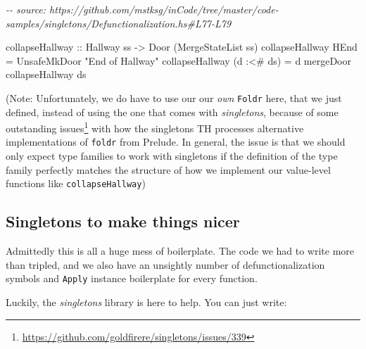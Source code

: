 \documentclass[]{article}
\newenvironment{Shaded}{}{}
\newcommand{\CommentTok}[1]{\textcolor[rgb]{0.38,0.63,0.69}{\textit{#1}}}
\newcommand{\DataTypeTok}[1]{\textcolor[rgb]{0.56,0.13,0.00}{#1}}
\newcommand{\NormalTok}[1]{#1}
\newcommand{\OperatorTok}[1]{\textcolor[rgb]{0.40,0.40,0.40}{#1}}
\newcommand{\OtherTok}[1]{\textcolor[rgb]{0.00,0.44,0.13}{#1}}
\newcommand{\StringTok}[1]{\textcolor[rgb]{0.25,0.44,0.63}{#1}}
\renewcommand{\href}[2]{#2\footnote{\url{#1}}}
\begin{document}
\begin{Shaded}
\begin{Highlighting}[]
\CommentTok{{-}{-} source: https://github.com/mstksg/inCode/tree/master/code{-}samples/singletons/Defunctionalization.hs\#L77{-}L79}

\OtherTok{collapseHallway ::} \DataTypeTok{Hallway}\NormalTok{ ss }\OtherTok{{-}\textgreater{}} \DataTypeTok{Door}\NormalTok{ (}\DataTypeTok{MergeStateList}\NormalTok{ ss)}
\NormalTok{collapseHallway }\DataTypeTok{HEnd}       \OtherTok{=} \DataTypeTok{UnsafeMkDoor} \StringTok{"End of Hallway"}
\NormalTok{collapseHallway (d }\OperatorTok{:\textless{}\#}\NormalTok{ ds) }\OtherTok{=}\NormalTok{ d }\OtherTok{\textasciigrave{}mergeDoor\textasciigrave{}}\NormalTok{ collapseHallway ds}
\end{Highlighting}
\end{Shaded}

(Note: Unfortunately, we do have to use our our \emph{own} \texttt{Foldr} here,
that we just defined, instead of using the one that comes with
\emph{singletons}, because of some
\href{https://github.com/goldfirere/singletons/issues/339}{outstanding issues}
with how the singletons TH processes alternative implementations of
\texttt{foldr} from Prelude. In general, the issue is that we should only expect
type families to work with singletons if the definition of the type family
perfectly matches the structure of how we implement our value-level functions
like \texttt{collapseHallway})

\subsection{Singletons to make things
nicer}\label{singletons-to-make-things-nicer}

Admittedly this is all a huge mess of boilerplate. The code we had to write more
than tripled, and we also have an unsightly number of defunctionalization
symbols and \texttt{Apply} instance boilerplate for every function.

Luckily, the \emph{singletons} library is here to help. You can just write:

\begin{Shaded}
\end{Shaded}
\end{document}
